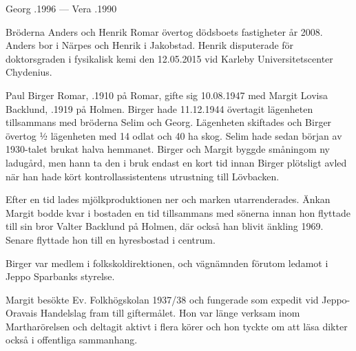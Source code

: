 Georg .1996  ---  Vera .1990



%


%
Bröderna Anders och Henrik Romar övertog dödsboets fastigheter år 2008. Anders bor i Närpes och Henrik i Jakobstad. Henrik disputerade för doktorsgraden i fysikalisk kemi den 12.05.2015 vid Karleby Universitetscenter Chydenius. \jhvspace{}



%
Paul Birger Romar, .1910 på Romar, gifte sig 10.08.1947 med Margit Lovisa Backlund, .1919 på Holmen. Birger hade 11.12.1944 övertagit lägenheten tillsammans med bröderna Selim och Georg. Lägenheten skiftades och Birger övertog ½ lägenheten med 14 odlat och 40 ha skog. Selim hade sedan början av 1930-talet brukat halva hemmanet. Birger och Margit byggde småningom ny ladugård, men hann ta den i bruk endast en kort tid innan Birger plötsligt avled när han hade kört kontrollassistentens utrustning till Lövbacken.

Efter en tid lades mjölkproduktionen ner och marken utarrenderades. Änkan Margit bodde kvar i bostaden en tid tillsammans med sönerna innan hon flyttade till sin bror Valter Backlund på Holmen, där också han blivit änkling 1969. Senare flyttade hon till en hyresbostad i centrum.

Birger var medlem i folkskoldirektionen, och vägnämnden förutom ledamot i Jeppo Sparbanks styrelse.

Margit besökte Ev. Folkhögskolan 1937/38 och fungerade som expedit vid Jeppo-Oravais Handelslag fram till giftermålet. Hon var länge verksam inom Martharörelsen och deltagit aktivt i flera körer och hon tyckte om att läsa dikter också i offentliga sammanhang.

\begin{jhchildren}
  \item {}
  \item {}
\end{jhchildren}

